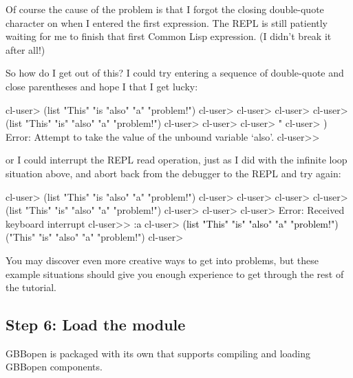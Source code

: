 \documentclass[10pt,twoside,english,pdftex]{article}
\begin{document}
Of course the cause of the problem is that I forgot the closing double-quote
character on  when I entered the first expression.  The REPL is
still patiently waiting for me to finish that first Common Lisp expression.
(I didn't break it after all!)

So how do I get out of this?  I could try entering a sequence of double-quote
and close parentheses and hope I that I get lucky:
%
\W\supp
\begin{example}
\textcolor{darkergray}{%
  cl-user> (list "This" "is "also" "a" "problem!")
  cl-user>
  cl-user>
  cl-user>
  cl-user> (list "This" "is" "also" "a" "problem!")
  cl-user>
  cl-user>
  cl-user> \textcolor{black}{"}
  cl-user> \textcolor{black}{)}
  Error: Attempt to take the value of the unbound variable `also'.
  cl-user>>}
\end{example}
%
or I could interrupt the REPL read operation, just as I did with the infinite
loop situation above, and abort back from the debugger to the REPL and try
again:
%
\W\supp\notpretop
\begin{example}
\textcolor{darkergray}{%
  cl-user> (list "This" "is "also" "a" "problem!")
  cl-user>
  cl-user>
  cl-user>
  cl-user> (list "This" "is" "also" "a" "problem!")
  cl-user>
  cl-user>
  cl-user> \textcolor{black}{}
  Error: Received keyboard interrupt 
  cl-user>> \textcolor{black}{:a}
  cl-user> \textcolor{black}{(list "This" "is" "also" "a" "problem!")}
  ("This" "is" "also" "a" "problem!")
  cl-user>}
\end{example}

You may discover even more creative ways to get into problems, but these
example situations should give you enough experience to get through the rest
of the tutorial.

\subsection*{Step 6: Load the  module}

GBBopen is packaged with its own 
that supports compiling and loading GBBopen components.
\end{document}
